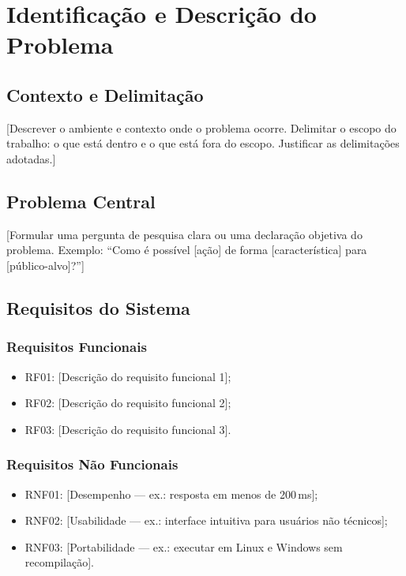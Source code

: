 \section{Identificação e Descrição do Problema}
\label{sec:problema}

\subsection{Contexto e Delimitação}
\label{sec:contexto}

[Descrever o ambiente e contexto onde o problema ocorre.
Delimitar o escopo do trabalho: o que está dentro e o que está fora do escopo.
Justificar as delimitações adotadas.]

\subsection{Problema Central}
\label{sec:problema-central}

[Formular uma pergunta de pesquisa clara ou uma declaração objetiva do problema.
Exemplo: ``Como é possível [ação] de forma [característica] para [público-alvo]?'']

\subsection{Requisitos do Sistema}
\label{sec:requisitos}

\subsubsection{Requisitos Funcionais}
\label{sec:rf}

\begin{itemize}
  \item RF01: [Descrição do requisito funcional 1];
  \item RF02: [Descrição do requisito funcional 2];
  \item RF03: [Descrição do requisito funcional 3].
\end{itemize}

\subsubsection{Requisitos Não Funcionais}
\label{sec:rnf}

\begin{itemize}
  \item RNF01: [Desempenho --- ex.: resposta em menos de 200\,ms];
  \item RNF02: [Usabilidade --- ex.: interface intuitiva para usuários não técnicos];
  \item RNF03: [Portabilidade --- ex.: executar em Linux e Windows sem recompilação].
\end{itemize}
